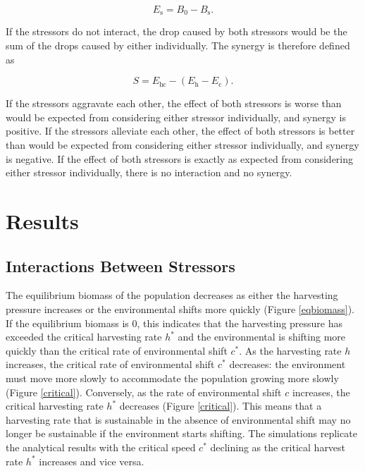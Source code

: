 \documentclass[]{article}
\begin{document}
\[E_\text{s}=B_0-B_\text{s}.\]

\noindent If the stressors do not interact, the drop caused by both stressors would be the sum of the drops caused by 
either individually. The synergy is therefore defined as

\[S = E_\text{hc}-\left(E_\text{h}-E_\text{c}\right).\]

\noindent If the stressors aggravate each other, the effect of both stressors is worse than would be expected from 
considering either stressor individually, and synergy is positive. If the stressors alleviate each other, the effect 
of both stressors is better than would be expected from considering either stressor individually, and synergy is 
negative. If the effect of both stressors is exactly as expected from considering either stressor individually, 
there is no interaction and no synergy.

\section{Results}

\subsection{Interactions Between Stressors }

The equilibrium biomass of the population decreases as either the harvesting pressure 
increases or the environmental shifts more quickly (Figure \ref{eqbiomass}). If the equilibrium biomass is $0$, this 
indicates that the harvesting pressure has exceeded the critical harvesting rate $h^*$ and the environmental 
is shifting more quickly than the critical rate of environmental shift $c^*$. As the harvesting rate $h$ increases, 
the critical rate of environmental shift $c^*$ decreases: the environment must move more slowly to 
accommodate the population growing more slowly (Figure \ref{critical}). Conversely, as the rate of 
environmental shift $c$ increases, the critical harvesting rate $h^*$ decreases (Figure  \ref{critical}). This 
means that a harvesting rate that is sustainable in the absence of environmental shift may no longer be sustainable if 
the environment starts shifting. The simulations replicate the analytical results with the critical speed $c^*$ 
declining as the critical harvest rate $h^*$ increases and vice versa.
\end{document}
